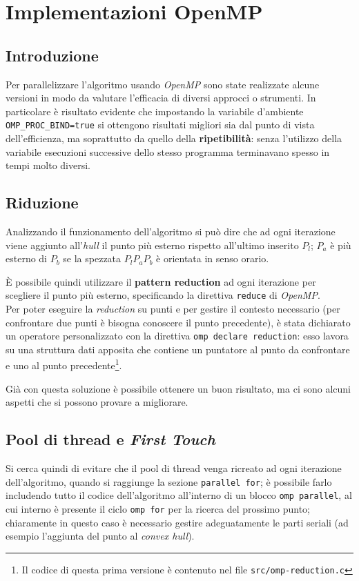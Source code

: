 \section{Implementazioni OpenMP}
\subsection{Introduzione}
Per parallelizzare l'algoritmo usando \emph{OpenMP} sono state realizzate alcune versioni in modo da valutare l'efficacia di diversi approcci o strumenti.
In particolare è risultato evidente che impostando la variabile d'ambiente \texttt{OMP\_PROC\_BIND=true} si ottengono risultati migliori sia dal punto di vista dell'efficienza, ma soprattutto da quello della \textbf{ripetibilità}: senza l'utilizzo della variabile esecuzioni successive dello stesso programma terminavano spesso in tempi molto diversi.

\subsection{Riduzione}
Analizzando il funzionamento dell'algoritmo si può dire che ad ogni iterazione viene aggiunto all'\emph{hull} il punto più esterno rispetto all'ultimo inserito $P_l$;
$P_a$ è più esterno di $P_b$ se la spezzata $P_lP_aP_b$ è orientata in senso orario.

È possibile quindi utilizzare il \textbf{pattern reduction} ad ogni iterazione per scegliere il punto più esterno, specificando la direttiva \texttt{reduce} di \emph{OpenMP}.\\
Per poter eseguire la \emph{reduction} su punti e per gestire il contesto necessario (per confrontare due punti è bisogna conoscere il punto precedente),
è stata dichiarato un operatore personalizzato con la direttiva \texttt{omp declare reduction}: esso lavora su una struttura dati apposita che contiene
un puntatore al punto da confrontare e uno al punto precedente\footnote{Il codice di questa prima versione è contenuto nel file \texttt{src/omp-reduction.c}}.

Già con questa soluzione è possibile ottenere un buon risultato, ma ci sono alcuni aspetti che si possono provare a migliorare.

\subsection{Pool di thread e \emph{First Touch}}
Si cerca quindi di evitare che il pool di thread venga ricreato ad ogni iterazione dell'algoritmo, quando si raggiunge la sezione \texttt{parallel for};
è possibile farlo includendo tutto il codice dell'algoritmo all'interno di un blocco \texttt{omp parallel}, al cui interno è presente il ciclo \texttt{omp for} per la ricerca del prossimo punto;
chiaramente in questo caso è necessario gestire adeguatamente le parti seriali (ad esempio l'aggiunta del punto al \emph{convex hull}).

